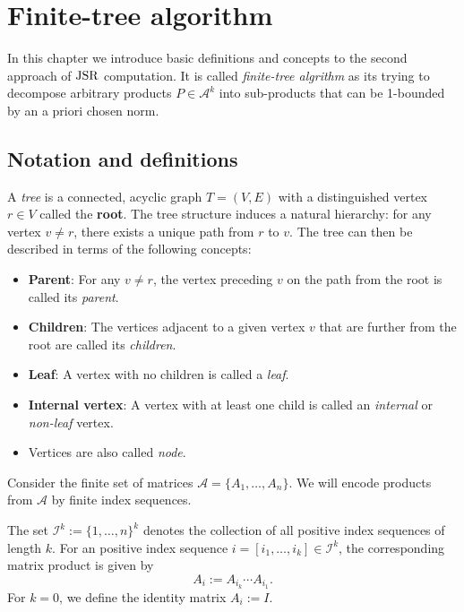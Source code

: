 
\chapter{Finite-tree algorithm}
\label{ch:finite-tree}
In this chapter we introduce basic definitions and concepts to the second approach of $\operatorname{JSR}$ computation. It is called \emph{finite-tree algrithm} as its trying to decompose arbitrary products $P \in \mathcal{A}^k$ into sub-products that can be 1-bounded by an a priori chosen norm.  

\section{Notation and definitions}

\begin{definition}
    A \emph{tree} is a connected, acyclic graph \( T = (V, E) \) with a distinguished vertex \( r \in V \) called the \textbf{root}. The tree structure induces a natural hierarchy: for any vertex \( v \neq r \), there exists a unique path from \( r \) to \( v \). The tree can then be described in terms of the following concepts:
    \begin{itemize}
        \item \textbf{Parent}: For any \( v \neq r \), the vertex preceding \( v \) on the path from the root is called its \emph{parent}.
        \item \textbf{Children}: The vertices adjacent to a given vertex \( v \) that are further from the root are called its \emph{children}.
        \item \textbf{Leaf}: A vertex with no children is called a \emph{leaf}.
        \item \textbf{Internal vertex}: A vertex with at least one child is called an \emph{internal} or \emph{non-leaf} vertex.
        \item Vertices are also called \emph{node}.
    \end{itemize}
\end{definition}

Consider the finite set of matrices \( \mathcal{A} = \{A_1, \dots, A_n\} \).
We will encode products from $\mathcal{A}$ by finite index sequences.

\begin{definition}
    The set \( \mathcal{I}^k := \{1, \dots, n\}^k \) denotes the collection of all positive index sequences of length \( k \). 
    For an positive index sequence \( i = [i_1, \dots, i_k] \in \mathcal{I}^k \), the corresponding matrix product is given by
    \[
        A_i := A_{i_k} \cdots A_{i_1}.
    \]
    For \( k = 0 \), we define the identity matrix \( A_i := I \).
\end{definition}

